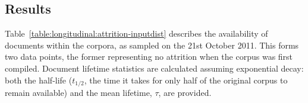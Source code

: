 










\subsection{Results}





Table~\ref{table:longitudinal:attrition-inputdist} describes the availability of documents within the corpora, as sampled on the 21st October 2011.  This forms two data points, the former representing no attrition when the corpus was first compiled.  
Document lifetime statistics are calculated assuming exponential decay: both the half-life ($t_{1/2}$, the time it takes for only half of the original corpus to remain available) and the mean lifetime, $\tau$, are provided.





